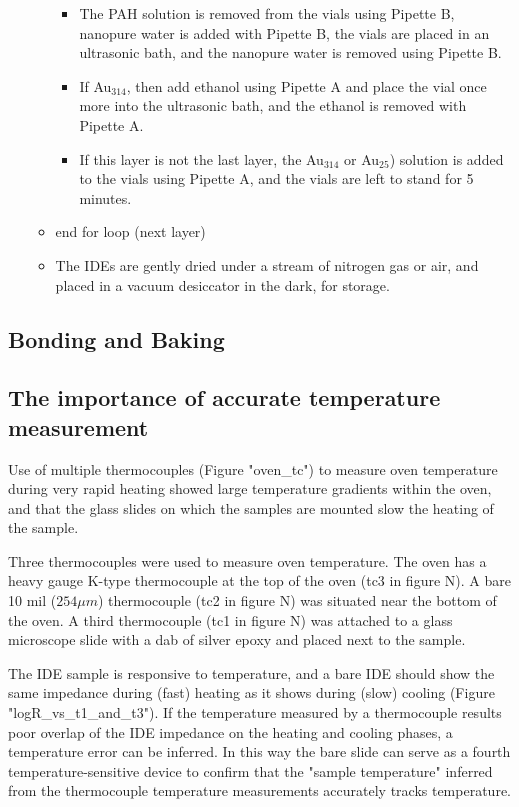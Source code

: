 \documentclass[12pt,oneside,english]{article}
\begin{document}
\begin{itemize}
\begin{itemize}
\begin{itemize}
				\item The PAH solution is removed from the vials using Pipette B,  nanopure water is added with Pipette B, the vials are placed in an ultrasonic bath, and the nanopure water is removed using Pipette B.
				\item If Au$_{314}$, then add ethanol using Pipette A and place the vial once more into the ultrasonic bath, and the ethanol is removed with Pipette A.
				\item If this layer is not the last layer, the Au$_{314}$ or Au$_{25}$) solution is added to the vials using Pipette A, and the vials are left to stand for 5 minutes.
			\end{itemize}
			\item end for loop (next layer)
			\item The IDEs are gently dried under a stream of nitrogen gas or air, and placed in a vacuum desiccator in the dark, for storage.
		\end{itemize}
	\end{itemize}

	\subsection{Bonding and Baking}
	
	\subsection{The importance of accurate temperature measurement}
	Use of multiple thermocouples (Figure "oven_tc") to measure oven temperature during very rapid heating showed large temperature gradients within the oven, and that the glass slides on which the samples are mounted slow the heating of the sample.

	Three thermocouples were used to measure oven temperature.  
	The oven has a heavy gauge K-type thermocouple at the top of the oven (tc3 in figure N).  
	A bare 10 mil ($254{\mu}m$) thermocouple (tc2 in figure N) was situated near the bottom of the oven.  
	A third thermocouple (tc1 in figure N) was attached to a glass microscope slide with a dab of silver epoxy and placed next to the sample.
	
	The IDE sample is responsive to temperature, and a bare IDE should show the same impedance during (fast) heating as it shows during (slow) cooling (Figure "logR_vs_t1_and_t3").  
	If the temperature measured by a thermocouple results poor overlap of the IDE impedance on the heating and cooling phases, a temperature error can be inferred.
	In this way the bare slide can serve as a fourth temperature-sensitive device to confirm that the "sample temperature" inferred from the thermocouple temperature measurements accurately tracks temperature.  
	
\end{document}
